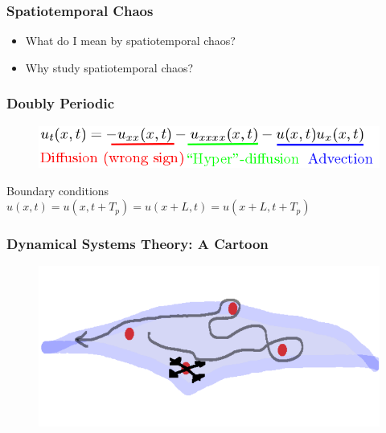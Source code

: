 \documentclass[mathserif, handout]{beamer}
\title[Tiling Infinite Space-time] %
{}
\subtitle{Spatiotemporal Tiling of the \KSe\, }
\author[M. Gudorf] %
{Matthew Gudorf %
}
\institute[GAtech] %
{
  Center for Nonlinear Science \\
  School of Physics \\
  Georgia Institute of Technology
}
\date[Physics Forum] %
{ Adviser: Prof. Predrag Cvitanovi\'c \\ \vspace{1em}
    Physics Forum, Oct 18 2018
} %
\begin{document}
\frame{\titlepage} %



\begin{frame}
  \frametitle{Spatiotemporal Chaos}
\begin{itemize}
\item What do I mean by spatiotemporal chaos?
\item Why study spatiotemporal chaos?

\end{itemize}
\end{frame}


\begin{frame}
  \frametitle{ Doubly Periodic \KSe\ }
\begin{figure}[h]
\includegraphics[width=.8\textwidth]{MNG_annotatedks}
\end{figure}
Boundary conditions $u(x,t)=u(x,t+T_p)=u(x+L,t)=u(x+L,t+T_p)$
\end{frame}


\begin{frame}
  \frametitle{Dynamical Systems Theory: A Cartoon}
\begin{figure}[h]
\includegraphics[width=.8\textwidth]{ManifoldCartoon}
\end{figure}
\end{frame}
\end{document}
